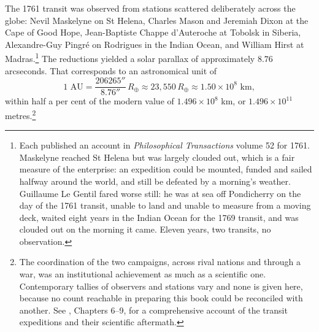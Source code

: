 The 1761 transit was observed from stations scattered deliberately across the globe: Nevil Maskelyne on St Helena, Charles Mason and Jeremiah Dixon at the Cape of Good Hope, Jean-Baptiste Chappe d'Auteroche at Tobolsk in Siberia, Alexandre-Guy Pingr\'e on Rodrigues in the Indian Ocean, and William Hirst at Madras.\footnote{Each published an account in \emph{Philosophical Transactions} volume 52 for 1761. Maskelyne reached St Helena but was largely clouded out, which is a fair measure of the enterprise: an expedition could be mounted, funded and sailed halfway around the world, and still be defeated by a morning's weather. Guillaume Le Gentil fared worse still: he was at sea off Pondicherry on the day of the 1761 transit, unable to land and unable to measure from a moving deck, waited eight years in the Indian Ocean for the 1769 transit, and was clouded out on the morning it came. Eleven years, two transits, no observation.} The reductions yielded a solar parallax of approximately $8.76$ arcseconds. That corresponds to an astronomical unit of
\[
  1 \text{ AU} = \frac{206265''}{8.76''} \, R_{\oplus} \approx 23{,}550 \, R_{\oplus} \approx 1.50 \times 10^{8} \text{ km},
\]
within half a per cent of the modern value of $1.496 \times 10^{8}$ km, or $1.496 \times 10^{11}$ metres.\footnote{The coordination of the two campaigns, across rival nations and through a war, was an institutional achievement as much as a scientific one. Contemporary tallies of observers and stations vary and none is given here, because no count reachable in preparing this book could be reconciled with another. See \textcite{Chapin1995}, Chapters 6--9, for a comprehensive account of the transit expeditions and their scientific aftermath.}
